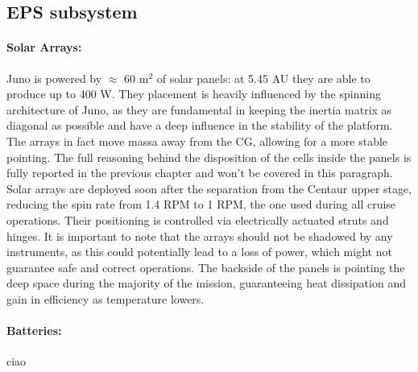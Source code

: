\subsection{EPS subsystem}
\label{subsec:eps_sub}

\paragraph{Solar Arrays:} Juno is powered by $\approx$ 60 m$^2$ of solar panels: at 5.45 AU they are able to produce up to 400 W. They placement is heavily influenced by the spinning architecture of Juno, as they are fundamental in keeping the inertia matrix as diagonal as possible and have a deep influence in the stability of the platform. The arrays in fact move massa away from the CG, allowing for a more stable pointing. The full reasoning behind the disposition of the cells inside the panels is fully reported in the previous chapter and won't be covered in this paragraph. Solar arrays are deployed soon after the separation from the Centaur upper stage, reducing the spin rate from 1.4 RPM to 1 RPM, the one used during all cruise operations. Their positioning is controlled via electrically actuated struts and hinges. It is important to note that the arrays should not be shadowed by any instruments, as this could potentially lead to a loss of power, which might not guarantee safe and correct operations. The backside of the panels is pointing the deep space during the majority of the mission, guaranteeing heat dissipation and gain in efficiency as temperature lowers. 

\vspace{-4mm}

\paragraph{Batteries:} ciao

\vspace{-4mm}